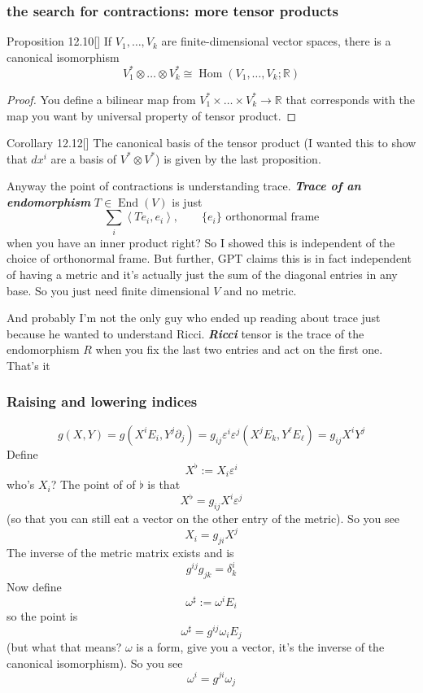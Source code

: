 \subsubsection{the search for contractions: more tensor products}

\begin{thing4}{Proposition 12.10}[\cite{les}]\label{prop:12.10}\leavevmode
If  \(V_1,\ldots,V_k\) are finite-dimensional vector spaces, there is a canonical isomorphism
\[V_1^*  \otimes\ldots \otimes V^*_k \cong \operatorname{Hom}(V_1,\ldots,V_k;\mathbb{R})\]
\end{thing4}
\begin{proof}\leavevmode
You define a bilinear map from \(V^*_1 \times \ldots \times V^*_k \to \mathbb{R}\) that corresponds with the map you want by universal property of tensor product.
\end{proof}

\begin{thing6}{Corollary 12.12}[\cite{les}]\leavevmode
The canonical basis of the tensor product (I wanted this to show that \(dx^i\) are a basis of \(V^* \otimes V^*\)) is given by the last proposition.
\end{thing6}

Anyway the point of contractions is understanding trace. \textit{\textbf{Trace of an endomorphism}} \(T \in \operatorname{End}(V)\) is just
\[\sum_i \left<Te_i,e_i\right>,\qquad \{e_i\}\text{ orthonormal frame} \]
when you have an inner product right? So I showed this is independent of the choice of orthonormal frame. But further, GPT claims this is in fact independent of having a metric and it's actually just the sum of the diagonal entries in any base. So you just need finite dimensional \(V\) and no metric.

And probably I'm not the only guy who ended up reading about trace just because he wanted to understand Ricci. \textit{\textbf{Ricci}} tensor is the trace of the endomorphism  \(R\) when you fix the last two entries and act on the first one. That's it

\subsubsection{Raising and lowering indices}

\[g(X,Y)=g(X^iE_i,Y^j\partial_j)=g_{ij}\varepsilon^i\varepsilon^j(X^jE_k,Y^\ell E_\ell)=g_{ij}X^iY^j\]
Define
\[X^\flat:=X_i\varepsilon^i\]
who's \(X_i\)? The point of of \(\flat\) is that
\[X^\flat =g_{ij}X^i\varepsilon^j\]
(so that you can still eat a vector on the other entry of the metric). So you see
\[X_i=g_{ji}X^j\]
The inverse of the metric matrix exists and is
\[g^{ij}g_{j k}=\delta^i_k\]
Now define
\[\omega^\sharp:=\omega^iE_i\]
so the point is
\[\omega^\sharp=g^{ij}\omega_iE_j\]
(but what that means? \(\omega\) is a form, give you a vector, it's the inverse of the canonical isomorphism). So you see
\[\omega^i=g^{ji}\omega_j\]



